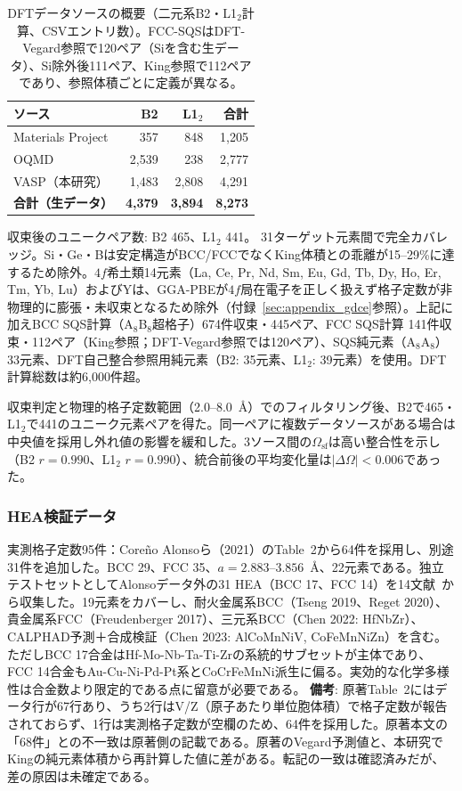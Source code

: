 \documentclass[5p,10pt]{elsarticle}
\begin{document}
\begin{table}[H]
\centering
\caption{DFTデータソースの概要（二元系B2・L1$_2$計算、CSVエントリ数）。FCC-SQSはDFT-Vegard参照で120ペア（Siを含む生データ）、Si除外後111ペア、King参照で112ペアであり、参照体積ごとに定義が異なる。}
\label{tab:dft_data}
\footnotesize
\begin{tabular}{@{}lrrr@{}}
\toprule
ソース & B2 & L1$_2$ & 合計 \\
\midrule
Materials Project & 357 & 848 & 1,205 \\
OQMD & 2,539 & 238 & 2,777 \\
VASP（本研究） & 1,483 & 2,808 & 4,291 \\
\midrule
\textbf{合計（生データ）} & \textbf{4,379} & \textbf{3,894} & \textbf{8,273} \\
\bottomrule
\end{tabular}
\par\smallskip
{\scriptsize 収束後のユニークペア数: B2 465、L1$_2$ 441。
31ターゲット元素間で完全カバレッジ。Si・Ge・Bは安定構造がBCC/FCCでなくKing体積との乖離が15--29\%に達するため除外。$4f$希土類14元素（La, Ce, Pr, Nd, Sm, Eu, Gd, Tb, Dy, Ho, Er, Tm, Yb, Lu）およびYは、GGA-PBEが$4f$局在電子を正しく扱えず格子定数が非物理的に膨張・未収束となるため除外（付録~\ref{sec:appendix_gdce}参照）。上記に加えBCC SQS計算（A$_8$B$_8$超格子）674件収束・445ペア、FCC SQS計算 141件収束・112ペア（King参照；DFT-Vegard参照では120ペア）、SQS純元素（A$_8$A$_8$）33元素、DFT自己整合参照用純元素（B2: 35元素、L1$_2$: 39元素）を使用。DFT計算総数は約6,000件超。}
\end{table}

収束判定と物理的格子定数範囲（2.0--8.0~\AA）でのフィルタリング後、B2で465・L1$_2$で441のユニーク元素ペアを得た。同一ペアに複数データソースがある場合は中央値を採用し外れ値の影響を緩和した。3ソース間の$\Omega_\text{sf}$は高い整合性を示し（B2 $r = 0.990$、L1$_2$ $r = 0.990$）、統合前後の平均変化量は$|\Delta\Omega| < 0.006$であった。

\subsubsection{HEA検証データ}
実測格子定数95件：Coreño Alonsoら（2021）\cite{Alonso2021}のTable~2から64件を採用し、別途31件を追加した。BCC 29、FCC 35、$a = 2.883$--$3.856$~\AA、22元素である。独立テストセットとしてAlonsoデータ外の31 HEA（BCC 17、FCC 14）を14文献~\cite{Senkov2012,Senkov2013_ActaMat,Otto2013,Niu2017,Stepanov2015,Dirras2016,Yao2016,Freudenberger2017,Wang2019,Tseng2019,Reget2020,Chen2022,Kantelis2025,Chen2023}から収集した。19元素をカバーし、耐火金属系BCC（Tseng 2019、Reget 2020）、貴金属系FCC（Freudenberger 2017）、三元系BCC（Chen 2022: HfNbZr）、CALPHAD予測＋合成検証（Chen 2023: AlCoMnNiV, CoFeMnNiZn）を含む。ただしBCC 17合金はHf-Mo-Nb-Ta-Ti-Zrの系統的サブセットが主体であり、FCC 14合金もAu-Cu-Ni-Pd-Pt系とCoCrFeMnNi派生に偏る。実効的な化学多様性は合金数より限定的である点に留意が必要である。
\textbf{備考}: 原著Table~2にはデータ行が67行あり、うち2行はV/Z（原子あたり単位胞体積）で格子定数が報告されておらず、1行は実測格子定数が空欄のため、64件を採用した。原著本文の「68件」との不一致は原著側の記載である。原著のVegard予測値と、本研究でKingの純元素体積から再計算した値に差がある。転記の一致は確認済みだが、差の原因は未確定である。
\end{document}
